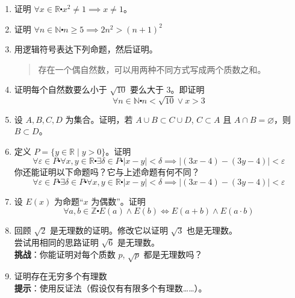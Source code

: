 \begin{enumerate}[label=(\arabic*)]
    \item 证明 $\forall x \in \mathbb{R} \centerdot x^2 \ne 1 \implies x \ne 1$。
    \item 证明 $\forall n \in \mathbb{N} \centerdot n \ge 5 \implies 2n^2 > (n+1)^2$ \label{exc:exercises4.9.2}
    \item 用逻辑符号表达下列命题，然后证明。
        \begin{quote}
            存在一个偶自然数，可以用两种不同方式写成两个质数之和。
        \end{quote}
    \item 证明每个自然数要么小于 $\sqrt{10}$ 要么大于 $3$。即证明
        \[\forall n \in \mathbb{N} \centerdot n<\sqrt{10} \lor x>3\]
    \item 设 $A,B,C,D$ 为集合。证明，若 $A \cup B \subset C \cup D$, $C \subset A$ 且 $A \cap B = \varnothing$，则 $B \subset D$。
    \item 定义 $P = \{y \in \mathbb{R} \mid y > 0\}$。证明
        \[\forall \varepsilon \in P \centerdot \forall x, y \in \mathbb{R} \centerdot \exists \delta \in P \centerdot |x - y| < \delta \implies |(3x - 4) - (3y - 4)| < \varepsilon\]
        你还能证明以下命题吗？它与上述命题有何不同？
        \[\forall \varepsilon \in P \centerdot \exists \delta \in P \centerdot \forall x, y \in \mathbb{R} \centerdot  |x - y| < \delta \implies |(3x - 4) - (3y - 4)| < \varepsilon\]
    \item 设 $E(x)$ 为命题``$x$ 为偶数''。证明
        \[\forall a, b \in \mathbb{Z} \centerdot E(a) \land E(b) \iff E(a + b) \land E(a \cdot b)\]
    \item 回顾 $\sqrt{2}$ 是无理数的证明。修改它以证明 $\sqrt{3}$ 也是无理数。\\
        尝试用相同的思路证明 $\sqrt{6}$ 是无理数。\\
        \textbf{挑战}：你能证明对每个质数 $p$, $\sqrt{p}$ 都是无理数吗？
    \item 证明存在无穷多个有理数\\
        \textbf{提示}：使用反证法（假设仅有有限多个有理数……）。
\end{enumerate}